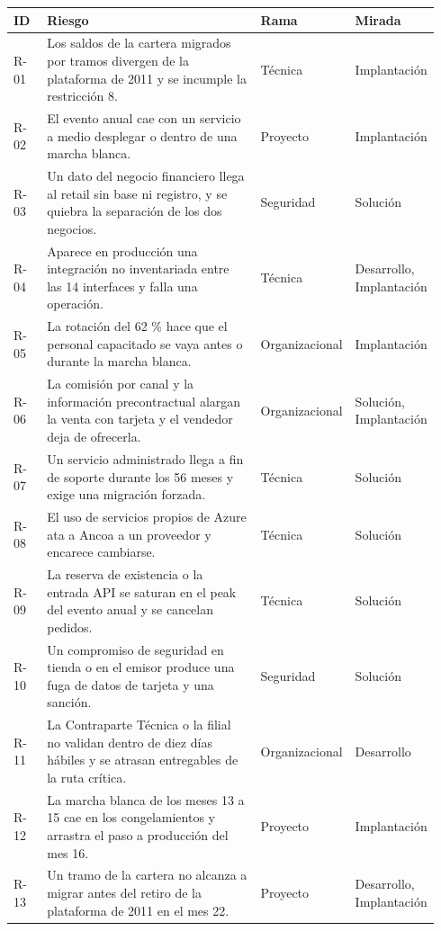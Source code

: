 \documentclass[11pt]{article}
\begin{document}
\begin{longtable}{p{0.080\linewidth}p{0.540\linewidth}p{0.160\linewidth}p{0.160\linewidth}}
\toprule
\textbf{ID} & \textbf{Riesgo} & \textbf{Rama} & \textbf{Mirada} \\
\midrule
\endhead
\bottomrule
\endlastfoot
R-01 & Los saldos de la cartera migrados por tramos divergen de la plataforma de 2011 y se incumple la restricción 8. & Técnica & Implantación \\
R-02 & El evento anual cae con un servicio a medio desplegar o dentro de una marcha blanca. & Proyecto & Implantación \\
R-03 & Un dato del negocio financiero llega al retail sin base ni registro, y se quiebra la separación de los dos negocios. & Seguridad & Solución \\
R-04 & Aparece en producción una integración no inventariada entre las 14 interfaces y falla una operación. & Técnica & Desarrollo, Implantación \\
R-05 & La rotación del 62 \% hace que el personal capacitado se vaya antes o durante la marcha blanca. & Organizacional & Implantación \\
R-06 & La comisión por canal y la información precontractual alargan la venta con tarjeta y el vendedor deja de ofrecerla. & Organizacional & Solución, Implantación \\
R-07 & Un servicio administrado llega a fin de soporte durante los 56 meses y exige una migración forzada. & Técnica & Solución \\
R-08 & El uso de servicios propios de Azure ata a Ancoa a un proveedor y encarece cambiarse. & Técnica & Solución \\
R-09 & La reserva de existencia o la entrada API se saturan en el peak del evento anual y se cancelan pedidos. & Técnica & Solución \\
R-10 & Un compromiso de seguridad en tienda o en el emisor produce una fuga de datos de tarjeta y una sanción. & Seguridad & Solución \\
R-11 & La Contraparte Técnica o la filial no validan dentro de diez días hábiles y se atrasan entregables de la ruta crítica. & Organizacional & Desarrollo \\
R-12 & La marcha blanca de los meses 13 a 15 cae en los congelamientos y arrastra el paso a producción del mes 16. & Proyecto & Implantación \\
R-13 & Un tramo de la cartera no alcanza a migrar antes del retiro de la plataforma de 2011 en el mes 22. & Proyecto & Desarrollo, Implantación \\

\end{longtable}
\end{document}
